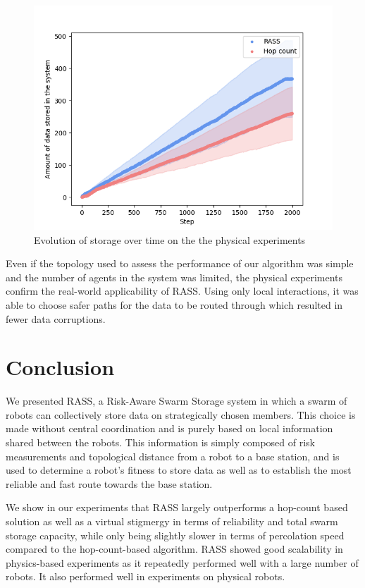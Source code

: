 \begin{figure}[htbp]
	\centering
    \includegraphics[width=\columnwidth]{figures/dora_mesh/storage.png}
    \caption[RASS physical storage]{Evolution of storage over time on the the physical experiments}
    \label{results:physicalStorage}
\end{figure}

Even if the topology used to assess the performance of our algorithm was simple and the number of agents in the system was limited, the physical experiments confirm the real-world applicability of \ac{RASS}. Using only local interactions, it was able to choose safer paths for the data to be routed through which resulted in fewer data corruptions.

\FloatBarrier

\section{Conclusion}
\label{conclusion}

We presented \ac{RASS}, a Risk-Aware Swarm Storage system in which a swarm of robots can collectively store data on strategically chosen members. This choice is made without central coordination and is purely based on local information shared between the robots. This information is simply composed of risk measurements and topological distance from a robot to a base station, and is used to determine a robot's fitness to store data as well as to establish the most reliable and fast route towards the base station.

We show in our experiments that \ac{RASS} largely outperforms a hop-count based solution as well as a virtual stigmergy in terms of reliability and total swarm storage capacity, while only being slightly slower in terms of percolation speed compared to the hop-count-based algorithm. \ac{RASS} showed good scalability in physics-based experiments as it repeatedly performed well with a large number of robots. It also performed well in experiments on physical robots.

